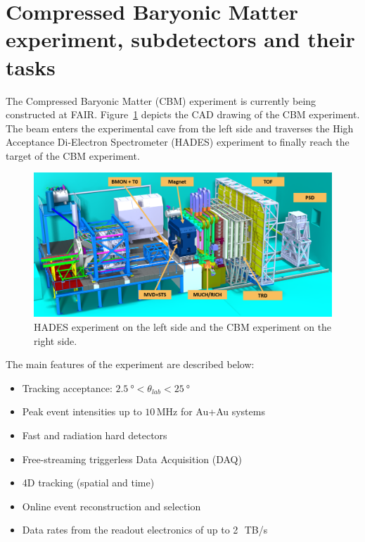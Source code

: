 

\section{Compressed Baryonic Matter experiment, subdetectors and their tasks}
The Compressed Baryonic Matter (\gls{CBM}) experiment is currently being constructed at \gls{FAIR}. Figure~\ref{fig:exp} depicts the CAD drawing of the \gls{CBM} experiment. The beam enters the experimental cave from the left side and traverses the High Acceptance Di-Electron Spectrometer (\gls{HADES}) experiment to finally reach the target of the \gls{CBM} experiment. 

\begin{figure}[!h]
    \centering
    \includegraphics[width=1\columnwidth]{Chapter1/images/CBMnew.png}
    \caption{HADES experiment on the left side and the \gls{CBM} experiment on the right side.}
    \label{fig:exp}
\end{figure}

The main features of the experiment are described below:
\begin{itemize}
\item Tracking acceptance: $\SI{2.5}{\degree} < \theta_{lab} < \SI{25}{\degree}$
\item Peak event intensities up to $10\,\mathrm{MHz}$ for Au+Au systems
\item Fast and radiation hard detectors
\item Free-streaming triggerless Data Acquisition (\gls{DAQ})
\item 4D tracking (spatial and time)
\item Online event reconstruction and selection
\item Data rates from the readout electronics of up to 2~\,TB/s
\end{itemize}


